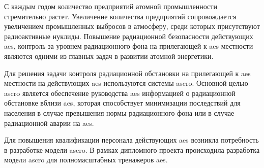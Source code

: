 
С каждым годом количество предприятий атомной промышленности стремительно растет. Увеличение количества предприятий 
сопровождается увеличением промышленных выбросов в атмосферу, среди которых присутствуют радиоактивные нуклиды. Повышение 
радиационной безопасности действующих \ac{aes}, контроль за уровнем радиационного фона на прилегающей к \ac{aes} местности
являются одними из главных задач в развитии атомной энергетики.

Для решения задачи контроля радиационной обстановки на прилегающей к \ac{aes} местности на действующих \ac{aes} 
используются системы \ac{ascro}. Основной целью \ac{ascro} является обеспечение руководства \ac{aes} информацией о 
радиационной обстановке вблизи \ac{aes}, которая способствует минимизации последствий для населения в случае превышения 
нормы радиационного фона или в случае радиационной аварии на \ac{aes}.

Для повышения квалификации персонала действующих \ac{aes} возникла потребность в разработке модели \ac{ascro}. В рамках 
дипломного проекта происходила разработка модели \ac{ascro} для полномасштабных тренажеров \ac{aes}. 

